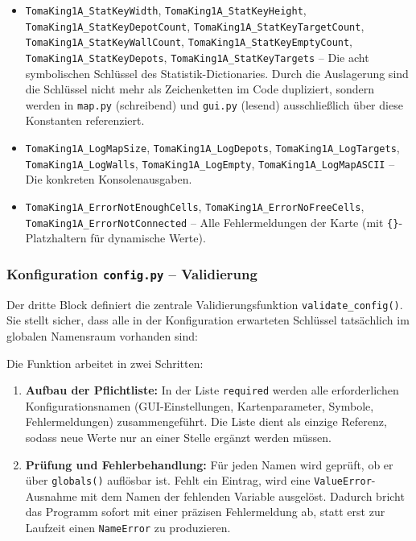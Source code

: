 \begin{itemize}
    \item \texttt{TomaKing1A\_StatKeyWidth}, \texttt{TomaKing1A\_StatKeyHeight}, \\ \texttt{TomaKing1A\_StatKeyDepotCount}, \texttt{TomaKing1A\_StatKeyTargetCount}, \\ \texttt{TomaKing1A\_StatKeyWallCount}, \texttt{TomaKing1A\_StatKeyEmptyCount}, \\ \texttt{TomaKing1A\_StatKeyDepots}, \texttt{TomaKing1A\_StatKeyTargets} – Die acht symbolischen Schlüssel des Statistik-Dictionaries. Durch die Auslagerung sind die Schlüssel nicht mehr als Zeichenketten im Code dupliziert, sondern werden in \texttt{map.py} (schreibend) und \texttt{gui.py} (lesend) ausschließlich über diese Konstanten referenziert.
    \item \texttt{TomaKing1A\_LogMapSize}, \texttt{TomaKing1A\_LogDepots}, \texttt{TomaKing1A\_LogTargets}, \texttt{TomaKing1A\_LogWalls}, \texttt{TomaKing1A\_LogEmpty}, \texttt{TomaKing1A\_LogMapASCII} – Die konkreten Konsolenausgaben.
    \item \texttt{TomaKing1A\_ErrorNotEnoughCells}, \texttt{TomaKing1A\_ErrorNoFreeCells}, \\ \texttt{TomaKing1A\_ErrorNotConnected} – Alle Fehlermeldungen der Karte (mit \texttt{\{\}}-Platzhaltern für dynamische Werte).
\end{itemize}


\subsubsection{Konfiguration \texttt{config.py} – Validierung}
\label{sssec:config_validierung}

Der dritte Block definiert die zentrale Validierungsfunktion \texttt{validate\_config()}. Sie stellt sicher, dass alle in der Konfiguration erwarteten Schlüssel tatsächlich im globalen Namensraum vorhanden sind:



Die Funktion arbeitet in zwei Schritten:
\begin{enumerate}
    \item \textbf{Aufbau der Pflichtliste:} In der Liste \texttt{required} werden alle erforderlichen Konfigurationsnamen (\acs{GUI}-Einstellungen, Kartenparameter, Symbole, Fehlermeldungen) zusammengeführt. Die Liste dient als einzige Referenz, sodass neue Werte nur an einer Stelle ergänzt werden müssen.
    \item \textbf{Prüfung und Fehlerbehandlung:} Für jeden Namen wird geprüft, ob er über \texttt{globals()} auflösbar ist. Fehlt ein Eintrag, wird eine \texttt{ValueError}-Ausnahme mit dem Namen der fehlenden Variable ausgelöst. Dadurch bricht das Programm sofort mit einer präzisen Fehlermeldung ab, statt erst zur Laufzeit einen \texttt{NameError} zu produzieren.
\end{enumerate}

